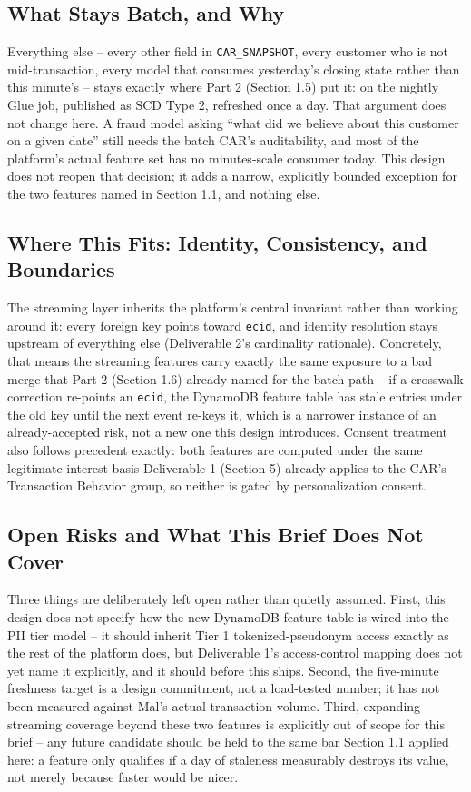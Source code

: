 \documentclass[11pt]{article}
\begin{document}
\subsection{What Stays Batch, and Why}
Everything else -- every other field in \texttt{CAR\_SNAPSHOT}, every customer who is not mid-transaction, every model that consumes yesterday's closing state rather than this minute's -- stays exactly where Part 2 (Section 1.5) put it: on the nightly Glue job, published as SCD Type 2, refreshed once a day. That argument does not change here. A fraud model asking ``what did we believe about this customer on a given date'' still needs the batch CAR's auditability, and most of the platform's actual feature set has no minutes-scale consumer today. This design does not reopen that decision; it adds a narrow, explicitly bounded exception for the two features named in Section 1.1, and nothing else.

\subsection{Where This Fits: Identity, Consistency, and Boundaries}
The streaming layer inherits the platform's central invariant rather than working around it: every foreign key points toward \texttt{ecid}, and identity resolution stays upstream of everything else (Deliverable 2's cardinality rationale). Concretely, that means the streaming features carry exactly the same exposure to a bad merge that Part 2 (Section 1.6) already named for the batch path -- if a crosswalk correction re-points an \texttt{ecid}, the DynamoDB feature table has stale entries under the old key until the next event re-keys it, which is a narrower instance of an already-accepted risk, not a new one this design introduces. Consent treatment also follows precedent exactly: both features are computed under the same legitimate-interest basis Deliverable 1 (Section 5) already applies to the CAR's Transaction Behavior group, so neither is gated by personalization consent.

\subsection{Open Risks and What This Brief Does Not Cover}
Three things are deliberately left open rather than quietly assumed. First, this design does not specify how the new DynamoDB feature table is wired into the PII tier model -- it should inherit Tier 1 tokenized-pseudonym access exactly as the rest of the platform does, but Deliverable 1's access-control mapping does not yet name it explicitly, and it should before this ships. Second, the five-minute freshness target is a design commitment, not a load-tested number; it has not been measured against Mal's actual transaction volume. Third, expanding streaming coverage beyond these two features is explicitly out of scope for this brief -- any future candidate should be held to the same bar Section 1.1 applied here: a feature only qualifies if a day of staleness measurably destroys its value, not merely because faster would be nicer.
\end{document}

